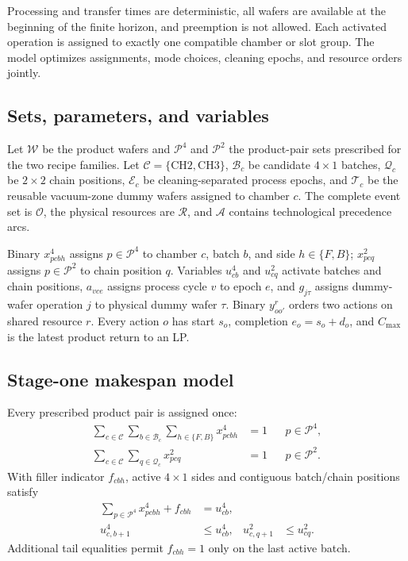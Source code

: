 \documentclass[preprint,12pt,authoryear]{elsarticle}
\newcommand{\cmax}{C_{\max}}
\begin{document}
Processing and transfer times are deterministic, all wafers are available at
the beginning of the finite horizon, and preemption is not allowed. Each
activated operation is assigned to exactly one compatible chamber or slot
group. The model optimizes assignments, mode choices, cleaning epochs, and
resource orders jointly.

\subsection{Sets, parameters, and variables}

Let $\mathcal W$ be the product wafers and $\mathcal P^4$ and
$\mathcal P^2$ the product-pair sets prescribed for the two recipe families.
Let $\mathcal C=\{\mathrm{CH2},\mathrm{CH3}\}$, $\mathcal B_c$ be candidate
$4\times1$ batches, $\mathcal Q_c$ be $2\times2$ chain positions,
$\mathcal E_c$ be cleaning-separated process epochs, and $\mathcal T_c$ be
the reusable vacuum-zone dummy wafers assigned to chamber $c$. The complete event set is $\mathcal O$,
the physical resources are $\mathcal R$, and $\mathcal A$ contains
technological precedence arcs.

Binary $x^4_{pcbh}$ assigns $p\in\mathcal P^4$ to chamber $c$, batch $b$, and
side $h\in\{F,B\}$; $x^2_{pcq}$ assigns $p\in\mathcal P^2$ to chain position
$q$. Variables $u^4_{cb}$ and $u^2_{cq}$ activate batches and chain
positions, $a_{vce}$ assigns process cycle $v$ to epoch $e$, and
$g_{j\tau}$ assigns dummy-wafer operation $j$ to physical dummy wafer $\tau$. Binary $y^r_{oo'}$ orders
two actions on shared resource $r$. Every action $o$ has start $s_o$,
completion $e_o=s_o+d_o$, and $\cmax$ is the latest product return to an LP.

\subsection{Stage-one makespan model}

Every prescribed product pair is assigned once:
\begin{align}
\sum_{c\in\mathcal C}\sum_{b\in\mathcal B_c}
\sum_{h\in\{F,B\}}x^4_{pcbh}&=1
&&p\in\mathcal P^4, \label{eq:assignment-four}\\
\sum_{c\in\mathcal C}\sum_{q\in\mathcal Q_c}x^2_{pcq}&=1
&&p\in\mathcal P^2. \label{eq:assignment-two}
\end{align}
With filler indicator $f_{cbh}$, active $4\times1$ sides and contiguous
batch/chain positions satisfy
\begin{align}
\sum_{p\in\mathcal P^4}x^4_{pcbh}+f_{cbh}&=u^4_{cb}, \label{eq:fill}\\
u^4_{c,b+1}&\le u^4_{cb},&
u^2_{c,q+1}&\le u^2_{cq}. \label{eq:contiguity}
\end{align}
Additional tail equalities permit $f_{cbh}=1$ only on the last active batch.
\end{document}
